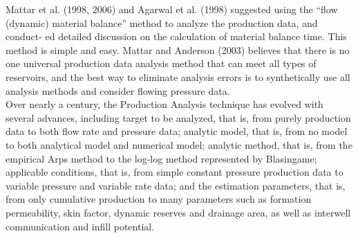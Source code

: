 \documentclass[12pt,a4paper]{report}
\begin{document}
Mattar et al. (1998, 2006) and Agarwal et al. (1998) suggested using the “flow (dynamic) material balance” method to analyze the production data, and conduct- ed detailed discussion on the calculation of material balance time. This method is simple and easy. Mattar and Anderson (2003) believes that there is no one universal production data analysis method that can meet all types of reservoirs, and the best way to eliminate analysis errors is to synthetically use all analysis methods and consider flowing pressure data.\\
Over nearly a century, the Production Analysis technique has evolved with several advances, including target to be analyzed, that is, from purely production data to both flow rate and pressure data; analytic model, that is, from no model to both analytical model and numerical model; analytic method, that is, from the empirical Arps method to the log-log method represented by Blasingame; applicable conditions, that is, from simple constant pressure production data to variable pressure and variable rate data; and the estimation parameters, that is, from only cumulative production to many parameters such as formation permeability, skin factor, dynamic reserves and drainage area, as well as interwell communication and infill potential.
\end{document}
